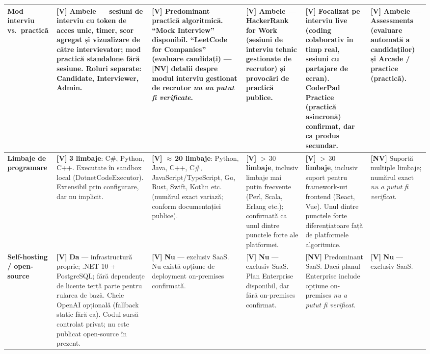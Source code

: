 \begin{longtable}{p{2.4cm}|p{3.0cm}|p{3.0cm}|p{3.0cm}|p{3.0cm}|p{3.0cm}}
\textbf{Mod interviu vs.\ practică}
&
  \textbf{[V]}
  \textbf{Ambele} — sesiuni de interviu cu token de acces
  unic, timer, scor agregat și vizualizare de către
  intervievator; mod practică standalone fără sesiune.
  Roluri separate: Candidate, Interviewer, Admin.
&
  \textbf{[V]}
  Predominant practică algoritmică.
  ``Mock Interview'' disponibil.
  ``LeetCode for Companies'' (evaluare candidați) — \textbf{[NV]}
  detalii despre modul interviu gestionat de recrutor
  \emph{nu au putut fi verificate}.
&
  \textbf{[V]}
  \textbf{Ambele} — HackerRank for Work (sesiuni de interviu
  tehnic gestionate de recrutor) și provocări de practică
  publice.
&
  \textbf{[V]}
  Focalizat pe \textbf{interviu live} (coding colaborativ
  în timp real, sesiuni cu partajare de ecran).
  CoderPad Practice (practică asincronă) confirmat,
  dar ca produs secundar.
&
  \textbf{[V]}
  \textbf{Ambele} — Assessments (evaluare automată a
  candidaților) și Arcade / practice (practică).
\\
\hline

\textbf{Limbaje de programare}
&
  \textbf{[V]}
  \textbf{3 limbaje}: C\#, Python, C++.
  Executate în sandbox local (DotnetCodeExecutor).
  Extensibil prin configurare, dar nu implicit.
&
  \textbf{[V]}
  \textbf{$\approx$\,20 limbaje}: Python, Java, C++, C\#,
  JavaScript/TypeScript, Go, Rust, Swift, Kotlin etc.
  (numărul exact variază; conform documentației publice).
&
  \textbf{[V]}
  \textbf{$>\,30$ limbaje}, inclusiv limbaje mai puțin
  frecvente (Perl, Scala, Erlang etc.);
  confirmată ca unul dintre punctele forte ale platformei.
&
  \textbf{[V]}
  \textbf{$>\,30$ limbaje}, inclusiv suport pentru
  framework-uri frontend (React, Vue).
  Unul dintre punctele forte diferențiatoare față de
  platformele algoritmice.
&
  \textbf{[NV]}
  Suportă multiple limbaje; numărul exact
  \emph{nu a putut fi verificat}.
\\
\hline

\textbf{Self-hosting / open-source}
&
  \textbf{[V]}
  \textbf{Da} — infrastructură proprie;
  .NET 10 + PostgreSQL; fără dependențe de licențe terță
  parte pentru rularea de bază.
  Cheie OpenAI opțională (fallback static fără ea).
  Codul sursă controlat privat; nu este publicat open-source
  în prezent.
&
  \textbf{[V]}
  \textbf{Nu} — exclusiv SaaS.
  Nu există opțiune de deployment on-premises confirmată.
&
  \textbf{[V]}
  \textbf{Nu} — exclusiv SaaS.
  Plan Enterprise disponibil, dar fără on-premises confirmat.
&
  \textbf{[NV]}
  Predominant SaaS.
  Dacă planul Enterprise include opțiune on-premises
  \emph{nu a putut fi verificat}.
&
  \textbf{[V]}
  \textbf{Nu} — exclusiv SaaS.
\\
\hline

\end{longtable}
\endgroup

